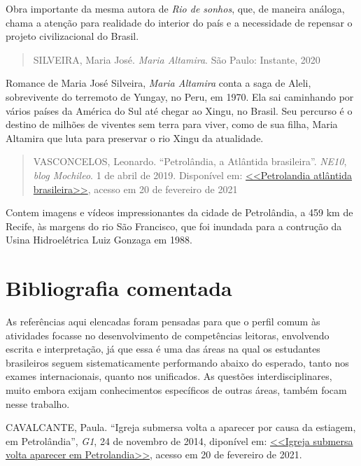 \documentclass[12pt]{extarticle}
\begin{document}
    Obra importante da mesma autora de \emph{Rio de sonhos}, que, de
    maneira análoga, chama a atenção para realidade do interior do país
    e a necessidade de repensar o projeto civilizacional do Brasil.

    \begin{quote}
    SILVEIRA, Maria José. \emph{Maria Altamira}. São Paulo: Instante,
    2020
    \end{quote}

    Romance de Maria José Silveira, \emph{Maria Altamira} conta a saga
    de Aleli, sobrevivente do terremoto de Yungay, no Peru, em 1970. Ela
    sai caminhando por vários países da América do Sul até chegar ao
    Xingu, no Brasil. Seu percurso é o destino de milhões de viventes
    sem terra para viver, como de sua filha, Maria Altamira que luta
    para preservar o rio Xingu da atualidade.

    \begin{quote}
    VASCONCELOS, Leonardo. ``Petrolândia, a Atlântida brasileira''.
    \emph{NE10}, \emph{blog Mochileo}. 1 de abril de 2019. Disponível
    em:
    \href{https://m.blogs.ne10.uol.com.br/mochileo/2019/04/01/petrolandia-atlantida-brasileira/}{<<Petrolandia atlântida brasileira>>},
    acesso em 20 de fevereiro de 2021
    \end{quote}

    Contem imagens e vídeos impressionantes da cidade de Petrolândia, a
    459 km de Recife, às margens do rio São Francisco, que foi inundada
    para a contrução da Usina Hidroelétrica Luiz Gonzaga em 1988.


\section{Bibliografia comentada}

    As referências aqui elencadas foram pensadas para que o perfil comum
    às atividades focasse no desenvolvimento de competências leitoras,
    envolvendo escrita e interpretação, já que essa é uma das áreas na
    qual os estudantes brasileiros seguem sistematicamente performando
    abaixo do esperado, tanto nos exames internacionais, quanto nos
    unificados. As questões interdisciplinares, muito embora exijam
    conhecimentos específicos de outras áreas, também focam nesse
    trabalho.

    CAVALCANTE, Paula. ``Igreja submersa volta a aparecer por causa da
    estiagem, em Petrolândia'', \emph{G1}, 24 de novembro de 2014,
    diponível em:
    \href{http://g1.globo.com/pe/caruaru-regiao/noticia/2014/11/igreja-submersa-volta-aparecer-por-causa-da-estiagem-em-petrolandia.html}{<<Igreja submersa volta aparecer em Petrolandia>>},
    acesso em 20 de fevereiro de 2021.
\end{document}
